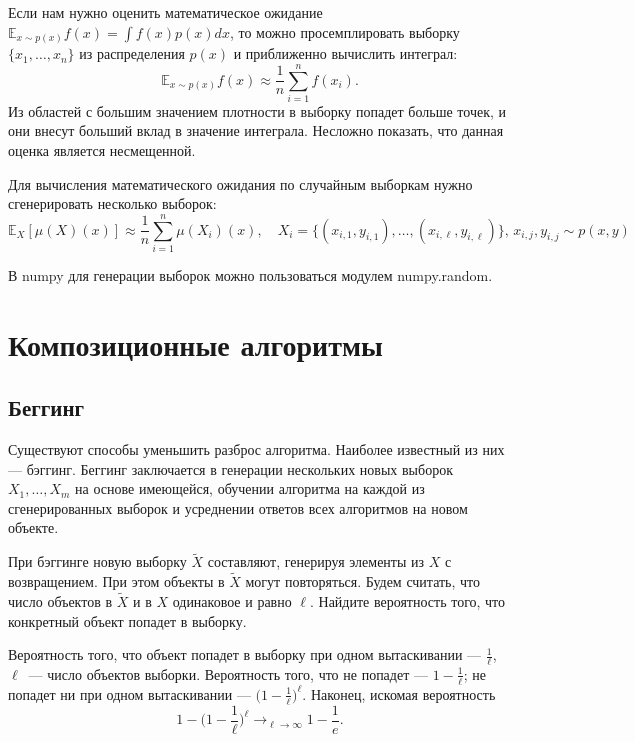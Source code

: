 \documentclass[12pt,fleqn]{article}
\begin{document}
    Если нам нужно оценить математическое ожидание $\mathbb{E}_{x \sim p(x)} f(x) = \int f(x) p(x) dx$, то можно просемплировать выборку $\{x_1, \dots, x_n\}$ из распределения $p(x)$  и приближенно вычислить интеграл:
    \[
    \mathbb{E}_{x \sim p(x)} f(x) \approx \frac 1 n \sum_{i=1}^n f(x_i).
    \]
    Из областей с большим значением плотности в выборку попадет больше точек, и они внесут больший вклад в значение интеграла. Несложно показать, что данная оценка является несмещенной.
    
    Для вычисления математического ожидания по случайным выборкам нужно сгенерировать несколько выборок: 
    \[
        \mathbb{E}_{X}
        [\mu(X)(x)]
        \approx
        \frac{1}{n}
        \sum_{i=1}^n
            \mu(X_i)(x),
            \quad
            X_i=\{(x_{i, 1}, y_{i, 1}), \dots, (x_{i, \ell}, y_{i, \ell})\}, \, x_{i,j}, y_{i, j} \sim p(x, y)
    \]
    
    В numpy для генерации выборок можно пользоваться модулем numpy.random. 
    
    \section{Композиционные алгоритмы}
    \subsection{Беггинг}
    Существуют способы уменьшить разброс алгоритма. Наиболее известный из них --- бэггинг. Беггинг заключается в генерации нескольких новых выборок $X_1, \dots, X_m$ на основе имеющейся, обучении алгоритма на каждой из сгенерированных выборок и усреднении ответов всех алгоритмов на новом объекте.  
    
    \begin{vkProblem}
    	При бэггинге новую выборку $\widetilde X$ составляют, генерируя элементы из $X$ с возвращением. При этом объекты в $\widetilde X$ могут повторяться. Будем считать, что число объектов в $\widetilde X$ и в $X$ одинаковое и равно $\ell$. Найдите вероятность того, что конкретный объект попадет в выборку.
    \end{vkProblem}%
    \begin{esSolution}
    	
    	Вероятность того, что объект попадет в выборку при одном вытаскивании --- $\frac 1 \ell$, $\ell$~--- число объектов выборки. Вероятность того, что не попадет --- $1 - \frac 1 \ell$; не попадет ни при одном вытаскивании --- 
    	$\biggl ( 1 - \frac 1 \ell \biggr)^\ell$. Наконец, искомая вероятность
    	\[
    	1 - \biggl ( 1 - \frac 1 \ell \biggr)^\ell \rightarrow_{\ell \rightarrow \infty}
    	1 - \frac 1 e .
    	\]
    \end{esSolution}
    
\end{document}

